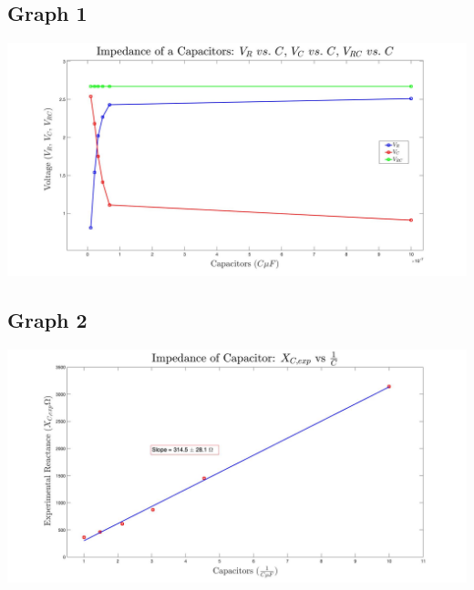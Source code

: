 \documentclass{article}
\begin{document}
\begin{center}
  \subsection*{Graph 1}
  \includegraphics[scale=0.25]{graph1.jpg}
  \subsection*{Graph 2}
  \includegraphics[scale=0.25]{graph2.jpg}
\end{center}
\end{document}
